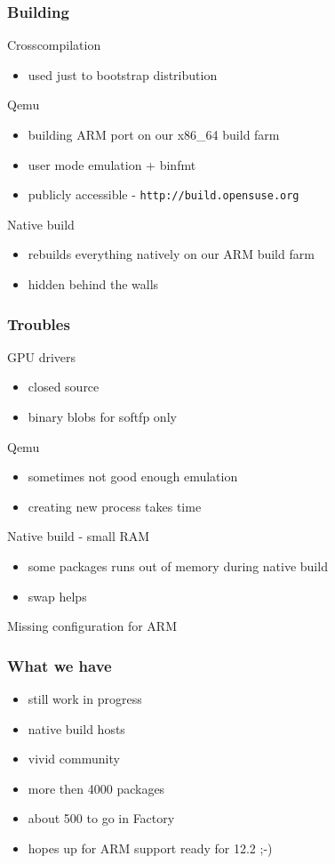 \documentclass{beamer}
\begin{document}
\begin{frame}[t]
\frametitle{Building}
Crosscompilation
\begin{itemize}
\item used just to bootstrap distribution
\end{itemize}
Qemu
\begin{itemize}
\item building ARM port on our x86\_64 build farm
\item user mode emulation + binfmt
\item publicly accessible - \texttt{http://build.opensuse.org}
\end{itemize}
Native build
\begin{itemize}
\item rebuilds everything natively on our ARM build farm
\item hidden behind the walls
\end{itemize}
\end{frame}

\begin{frame}[t]
\frametitle{Troubles}
GPU drivers
\begin{itemize}
\item closed source
\item binary blobs for softfp only
\end{itemize}
Qemu
\begin{itemize}
\item sometimes not good enough emulation
\item creating new process takes time
\end{itemize}
Native build - small RAM
\begin{itemize}
\item some packages runs out of memory during native build
\item swap helps
\end{itemize}
Missing configuration for ARM
\end{frame}

\begin{frame}[t]
\frametitle{What we have}
\begin{itemize}
   \item still work in progress
   \item native build hosts
   \item vivid community
   \item more then 4000 packages
   \item about 500 to go in Factory
   \item hopes up for ARM support ready for 12.2 ;-)
\end{itemize}
\end{frame}
\end{document}
